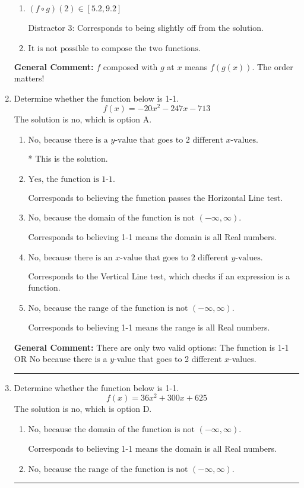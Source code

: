 \documentclass{extbook}[14pt]
\newcommand{\litem}[1]{\item #1

\rule{\textwidth}{0.4pt}}
\begin{document}
\begin{enumerate}
{\begin{enumerate}[label=\Alph*.]
 Distractor 2: Corresponds to being slightly off from the solution.
\item \( (f \circ g)(2) \in [5.2, 9.2] \)

 Distractor 3: Corresponds to being slightly off from the solution.
\item \( \text{It is not possible to compose the two functions.} \)


\end{enumerate}

\textbf{General Comment:} $f$ composed with $g$ at $x$ means $f(g(x))$. The order matters!
}
\litem{
Determine whether the function below is 1-1.
\[ f(x) = -20 x^2 - 247 x - 713 \]The solution is \( \text{no} \), which is option A.\begin{enumerate}[label=\Alph*.]
\item \( \text{No, because there is a $y$-value that goes to 2 different $x$-values.} \)

* This is the solution.
\item \( \text{Yes, the function is 1-1.} \)

Corresponds to believing the function passes the Horizontal Line test.
\item \( \text{No, because the domain of the function is not $(-\infty, \infty)$.} \)

Corresponds to believing 1-1 means the domain is all Real numbers.
\item \( \text{No, because there is an $x$-value that goes to 2 different $y$-values.} \)

Corresponds to the Vertical Line test, which checks if an expression is a function.
\item \( \text{No, because the range of the function is not $(-\infty, \infty)$.} \)

Corresponds to believing 1-1 means the range is all Real numbers.
\end{enumerate}

\textbf{General Comment:} There are only two valid options: The function is 1-1 OR No because there is a $y$-value that goes to 2 different $x$-values.
}
\litem{
Determine whether the function below is 1-1.
\[ f(x) = 36 x^2 + 300 x + 625 \]The solution is \( \text{no} \), which is option D.\begin{enumerate}[label=\Alph*.]
\item \( \text{No, because the domain of the function is not $(-\infty, \infty)$.} \)

Corresponds to believing 1-1 means the domain is all Real numbers.
\item \( \text{No, because the range of the function is not $(-\infty, \infty)$.} \)


\end{enumerate}}
\end{enumerate}
\end{document}

